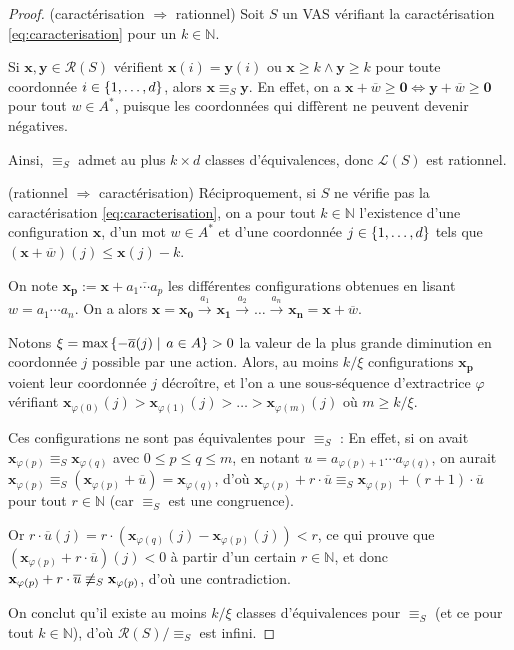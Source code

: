 \documentclass[a4paper,final]{article}
\theoremstyle{definition}
\let\phi\varphi
\let\leq\leqslant
\let\geq\geqslant
\newcommand{\set}[2]{\left\{#1\mathrel{\left|\vphantom{#1}\vphantom{#2}\right.}#2\right\}}
\newcommand{\os}[1]{\left\{\mathinner{#1}\right\}}
\newcommand{\N}{\ensuremath{\mathbb{N}}}
\newcommand{\lang}{\ensuremath{\mathcal{L}}}
\newcommand{\trans}[2]{\ensuremath{\stackrel{#1}{\longrightarrow}_{#2}}}
\newcommand{\vect}[1]{\ensuremath{\mathbf{#1}}}
\newcommand{\conf}[1]{\ensuremath{\mathcal{R}(#1)}}
\newcommand{\rel}{\ensuremath{\equiv}}
\newcommand{\equivaut}{\ensuremath{\Leftrightarrow}}
\newcommand{\valeur}[1]{\ensuremath{\overline{#1}}}
\begin{document}
\begin{proof}
(caractérisation $\Rightarrow$ rationnel)
Soit $S$ un VAS vérifiant la caractérisation \eqref{eq:caracterisation} pour un $k\in\N$.

Si $\vect{x},\vect{y}\in\conf{S}$ vérifient 
$\vect{x}(i)=\vect{y}(i)$ ou $\vect{x}\geq k \land \vect{y}\geq k$
pour toute coordonnée $i\in\os{1,\dots,d}$, alors $\vect{x}\rel_S \vect{y}$. 
En effet, on a $\vect{x} +\valeur{w} \geq\vect{0} \equivaut \vect{y} +\valeur{w} \geq\vect{0}$ pour tout $w\in A^\ast$, 
puisque les coordonnées qui diffèrent ne peuvent devenir négatives.

Ainsi, $\rel_S$ admet au plus $k\times d$ classes d'équivalences, donc $\lang(S)$ est rationnel.

\vspace{2mm}\noindent
(rationnel $\Rightarrow$ caractérisation)
Réciproquement, si $S$ ne vérifie pas la caractérisation \eqref{eq:caracterisation}, 
on a pour tout $k\in\N$ l'existence d'une configuration $\vect{x}$, d'un mot $w\in A^\ast$ et d'une coordonnée $j\in\os{1,\dots,d}$ tels que $(\vect{x} +\valeur{w})(j)\leq \vect{x}(j)-k$.

On note $\vect{x_p}:=\vect{x} +\valeur{a_1\cdots a_p}$ les différentes configurations obtenues en lisant $w=a_1\cdots a_n$.
On a alors $\vect{x}=\vect{x_0} \trans{a_1}{}\vect{x_1} \trans{a_2}{}\dots \trans{a_n}{}\vect{x_n}= \vect{x} +\valeur{w}$.

Notons $\xi = \text{max}\set{-\valeur{a}(j)} {a\in A} >0$ la valeur de la plus grande diminution en coordonnée $j$ possible par une action.
Alors, au moins $k/\xi$ configurations $\vect{x_p}$ voient leur coordonnée $j$ décroître,
et l'on a une sous-séquence d'extractrice $\phi$ vérifiant $\vect{x}_{\phi(0)}(j)>\vect{x}_{\phi(1)}(j)>\dots>\vect{x}_{\phi(m)}(j)$ où $m\geq k/\xi$.

Ces configurations ne sont pas équivalentes pour $\rel_S$ :
En effet, si on avait $\vect{x}_{\phi(p)}\rel_S \vect{x}_{\phi(q)}$ avec $0\leq p\leq q\leq m$, en notant $u=a_{\phi(p)+1}\cdots a_{\phi(q)}$, 
on aurait $\vect{x}_{\phi(p)}\rel_S (\vect{x}_{\phi(p)} +\valeur{u})=\vect{x}_{\phi(q)}$, d'où $\vect{x}_{\phi(p)}+r\cdot \valeur{u}\rel_S \vect{x}_{\phi(p)}+(r+1)\cdot \valeur{u}$ pour tout $r\in\N$ (car $\rel_S$ est une congruence).

Or $r\cdot\valeur{u}(j) =r\cdot(\vect{x}_{\phi(q)}(j) -\vect{x}_{\phi(p)}(j)) <r$, ce qui prouve que $(\vect{x}_{\phi(p)}+r\cdot \valeur{u})(j)<0$ à partir d'un certain $r\in\N$, et donc $\vect{x}_{\phi(p)}+r\cdot \valeur{u} \not\rel_S \vect{x}_{\phi(p)}$, d'où une contradiction.

On conclut qu'il existe au moins $k/\xi$ classes d'équivalences pour $\rel_S$ (et ce pour tout $k\in\N$), d'où $\conf{S}/\rel_S$ est infini.
\end{proof}
\end{document}
